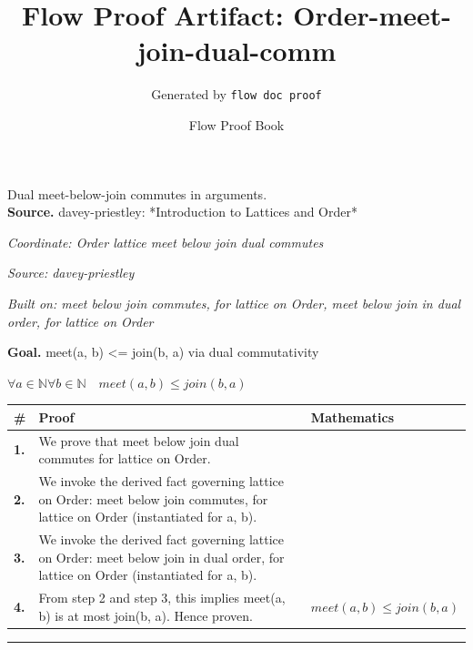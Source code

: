 \documentclass[11pt]{article}
\title{Flow Proof Artifact: Order-meet-join-dual-comm}
\author{Generated by \texttt{flow doc proof}}
\date{Flow Proof Book}
\theoremstyle{definition}
\begin{document}
\maketitle
Dual meet-below-join commutes in arguments.\\[0.5em]
\textbf{Source.} davey-priestley: *Introduction to Lattices and Order*\\[0.5em]
\bigskip
{}\par
\smallskip\noindent\textit{Coordinate: Order \cdot lattice \cdot meet below join dual commutes}\par
\smallskip\noindent\textit{Source: davey-priestley}\par
\smallskip\noindent\textit{Built on: meet below join commutes, for lattice on Order, meet below join in dual order, for lattice on Order}\par
\medskip
\noindent\textbf{Goal.} meet(a, b) <= join(b, a) via dual commutativity\par
\noindent$\displaystyle \forall a \in \mathbb{N} \forall b \in \mathbb{N}\quad meet(a, b) \le join(b, a)$\par
\medskip
\noindent
\begin{tabular}{@{} >{\raggedright\arraybackslash}p{} >{\raggedright\arraybackslash}p{} >{\raggedleft\arraybackslash}p{} @{}}
\textbf{\#} & \textbf{Proof} & \textbf{Mathematics} \\
\midrule
\textbf{1.} & We prove that meet below join dual commutes for lattice on Order. & \\[0.45em]
\textbf{2.} & We invoke the derived fact governing lattice on Order: meet below join commutes, for lattice on Order (instantiated for a, b). & \\[0.45em]
\textbf{3.} & We invoke the derived fact governing lattice on Order: meet below join in dual order, for lattice on Order (instantiated for a, b). & \\[0.45em]
\textbf{4.} & From step 2 and step 3, this implies meet(a, b) is at most join(b, a). Hence proven. & $\displaystyle meet(a, b) \le join(b, a)$ \\[0.45em]
\bottomrule
\end{tabular}
\label{thm:Order-lattice-meet_below_join_dual_commutes}
\par\medskip\hrule
\end{document}
